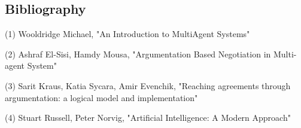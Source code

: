\documentclass{article}
\begin{document}
\subsection{Bibliography}
\noindent
(1) Wooldridge Michael, "An Introduction to MultiAgent Systems"

\noindent
(2) Ashraf El-Sisi, Hamdy Mousa, "Argumentation Based Negotiation in Multi-agent System"

\noindent
(3) Sarit Kraus, Katia Sycara, Amir Evenchik, "Reaching agreements through argumentation: a logical model and implementation"

\noindent
(4) Stuart Russell, Peter Norvig, "Artificial Intelligence: A Modern Approach"
\end{document}

